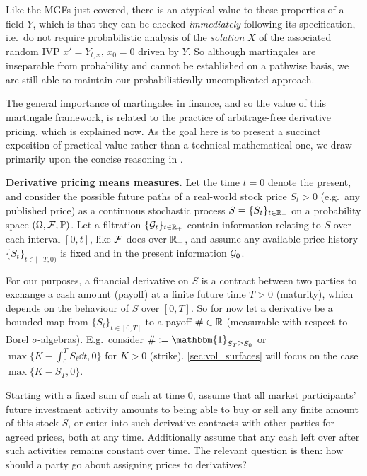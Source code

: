 Like the MGFs just covered, there is an atypical value to these properties of a field $Y$, which is that they can be checked \emph{immediately} following its specification, i.e.~do not require probabilistic analysis of the \emph{solution} $X$ of the associated random IVP $x'=Y_{t,x}$, $x_0=0$ driven by $Y$. So although martingales are inseparable from probability and cannot be established on a pathwise basis, we are still able to maintain our probabilistically uncomplicated approach.

The general importance of martingales in finance, and so the value of this martingale framework, is related to the practice of arbitrage-free derivative pricing, which is explained now. As the goal here is to present a succinct exposition of practical value rather than a technical mathematical one, we draw primarily upon the concise reasoning in \cite{cont_2003}.

\vspace{3mm}\textbf{Derivative pricing means measures.} Let the time $t=0$ denote the present, and consider the possible future paths of a real-world stock price $S_t>0$ (e.g.~any published price) as a continuous stochastic process $S=\{S_t\}_{t\in\mathbb{R}_+}$ on a probability space $(\Omega,\mathcal{F},\mathbb{P})$. Let a filtration $\{\mathcal{G}_t\}_{t\in\mathbb{R}_+}$ contain information relating to $S$ over each interval $[0,t]$, like $\mathcal{F}$ does over $\mathbb{R}_+$, and assume any available price history $\{S_t\}_{t\in[-T,0)}$ is fixed and in the present information $\mathcal{G}_0$.

For our purposes, a financial derivative on $S$ is a contract between two parties to exchange a cash amount (payoff) at a finite future time $T>0$ (maturity), which depends on the behaviour of $S$ over $[0,T]$. So for now let a derivative be a bounded map from $\{S_t\}_{t\in[0,T]}$ to a payoff $\#\in\mathbb{R}$ (measurable with respect to Borel $\sigma$-algebras). E.g.~consider $\#:=\mathbbm{1}_{S_T\ge S_0}$ or $\max\{K - \int_0^T S_t\dd t, 0\}$ for $K>0$ (strike). \autoref{sec:vol_surfaces} will focus on the case $\max\{K - S_T, 0\}$.

Starting with a fixed sum of cash at time $0$, assume that all market participants' future investment activity amounts to being able to buy or sell any finite amount of this stock $S$, or enter into such derivative contracts with other parties for agreed prices, both at any time. Additionally assume that any cash left over after such activities remains constant over time. The relevant question is then: how should a party go about assigning prices to derivatives?

